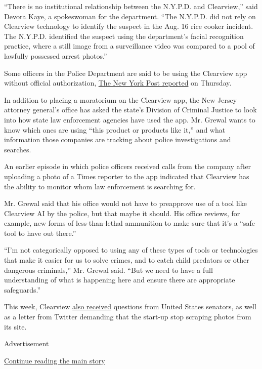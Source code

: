 ``There is no institutional relationship between the N.Y.P.D. and
Clearview,'' said Devora Kaye, a spokeswoman for the department. ``The
N.Y.P.D. did not rely on Clearview technology to identify the suspect in
the Aug. 16 rice cooker incident. The N.Y.P.D. identified the suspect
using the department's facial recognition practice, where a still image
from a surveillance video was compared to a pool of lawfully possessed
arrest photos.''

Some officers in the Police Department are said to be using the
Clearview app without official authorization,
\href{https://nypost.com/2020/01/23/rogue-nypd-cops-are-using-sketchy-facial-recognition-app-clearview/}{The
New York Post reported} on Thursday.

In addition to placing a moratorium on the Clearview app, the New Jersey
attorney general's office has asked the state's Division of Criminal
Justice to look into how state law enforcement agencies have used the
app. Mr. Grewal wants to know which ones are using ``this product or
products like it,'' and what information those companies are tracking
about police investigations and searches.

An earlier episode in which police officers received calls from the
company after uploading a photo of a Times reporter to the app indicated
that Clearview has the ability to monitor whom law enforcement is
searching for.

Mr. Grewal said that his office would not have to preapprove use of a
tool like Clearview AI by the police, but that maybe it should. His
office reviews, for example, new forms of less-than-lethal ammunition to
make sure that it's a ``safe tool to have out there.''

``I'm not categorically opposed to using any of these types of tools or
technologies that make it easier for us to solve crimes, and to catch
child predators or other dangerous criminals,'' Mr. Grewal said. ``But
we need to have a full understanding of what is happening here and
ensure there are appropriate safeguards.''

This week, Clearview
\href{https://www.nytimes.com/2020/01/22/technology/clearview-ai-twitter-letter.html}{also
received} questions from United States senators, as well as a letter
from Twitter demanding that the start-up stop scraping photos from its
site.

Advertisement

\protect\hyperlink{after-bottom}{Continue reading the main story}


